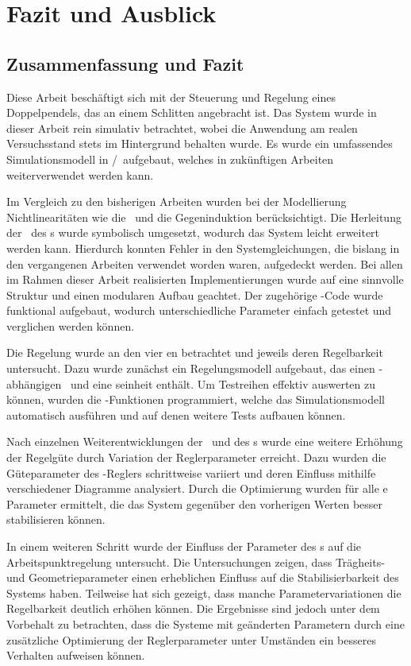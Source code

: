 \chapter{Fazit und Ausblick}

\section{Zusammenfassung und Fazit}

Diese Arbeit beschäftigt sich mit der Steuerung und Regelung eines Doppelpendels, das an einem Schlitten angebracht ist.
Das System wurde in dieser Arbeit rein simulativ betrachtet, wobei die Anwendung am realen Versuchsstand stets im Hintergrund behalten wurde.
Es wurde ein umfassendes Simulationsmodell in \ml/\sm\ aufgebaut, welches in zukünftigen Arbeiten weiterverwendet werden kann. 

Im Vergleich zu den bisherigen Arbeiten wurden bei der Modellierung Nichtlinearitäten wie die \crb\ und die Gegeninduktion berücksichtigt.
Die Herleitung der \bwgl\ des \spds s wurde symbolisch umgesetzt, wodurch das System leicht erweitert werden kann.
Hierdurch konnten Fehler in den Systemgleichungen, die bislang in den vergangenen Arbeiten verwendet worden waren, aufgedeckt werden.
Bei allen im Rahmen dieser Arbeit realisierten Implementierungen wurde auf eine sinnvolle Struktur und einen modularen Aufbau geachtet.
Der zugehörige \ml-Code wurde funktional aufgebaut, wodurch unterschiedliche Parameter einfach getestet und verglichen werden können.

Die Regelung wurde an den vier \ap en betrachtet und jeweils deren Regelbarkeit untersucht.
Dazu wurde zunächst ein Regelungsmodell aufgebaut, das einen \ap-abhängigen \zsr\ und eine \vorst seinheit enthält.
Um Testreihen effektiv auswerten zu können, wurden die \xots-Funktionen programmiert, welche das Simulationsmodell automatisch ausführen und auf denen weitere Tests aufbauen können.

Nach einzelnen Weiterentwicklungen der \vorst\ und des \beob s wurde eine weitere Erhöhung der Regelgüte durch Variation der Reglerparameter erreicht.
Dazu wurden die Güteparameter des \ricc-Reglers schrittweise variiert und deren Einfluss mithilfe verschiedener Diagramme analysiert.
Durch die Optimierung wurden für alle \ap e Parameter ermittelt, die das System gegenüber den vorherigen Werten besser stabilisieren können.

In einem weiteren Schritt wurde der Einfluss der Parameter des \dpd s auf die Arbeitspunktregelung untersucht.
Die Untersuchungen zeigen, dass Trägheits- und Geometrieparameter einen erheblichen Einfluss auf die Stabilisierbarkeit des Systems haben.
Teilweise hat sich gezeigt, dass manche Parametervariationen die Regelbarkeit deutlich erhöhen können.
Die Ergebnisse sind jedoch unter dem Vorbehalt zu betrachten, dass die Systeme mit geänderten Parametern durch eine zusätzliche Optimierung der Reglerparameter unter Umständen ein besseres Verhalten aufweisen können. 

